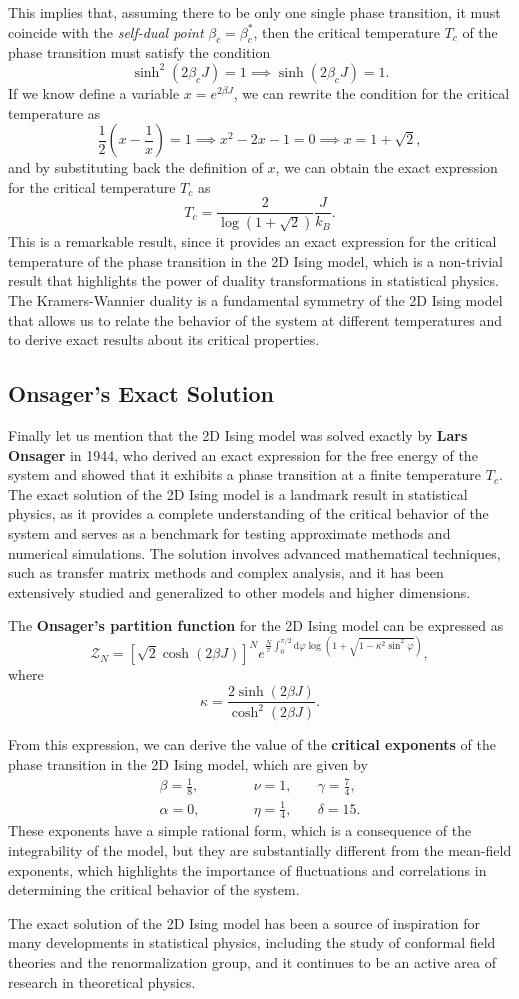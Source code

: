 This implies that, assuming there to be only one single phase transition, it must coincide with the \textit{self-dual point} \(\beta_c=\beta^*_c\), then the critical temperature \(T_c\) of the phase transition must satisfy the condition
\[
  \sinh^2(2 \beta_c J) = 1 \implies \sinh(2 \beta_c J) = 1.
\]
If we know define a variable \(x = e^{2 \beta J}\), we can rewrite the condition for the critical temperature as
\[
  \frac{1}{2}(x - \frac{1}{x}) = 1 \implies x^2 - 2 x - 1 = 0 \implies x = 1 + \sqrt{2},
\]
and by substituting back the definition of \(x\), we can obtain the exact expression for the critical temperature \(T_c\) as
\[
  T_c = \frac{2}{\log(1 + \sqrt{2})} \frac{J}{k_B}.
\]
This is a remarkable result, since it provides an exact expression for the critical temperature of the phase transition in the 2D Ising model, which is a non-trivial result that highlights the power of duality transformations in statistical physics. The Kramers-Wannier duality is a fundamental symmetry of the 2D Ising model that allows us to relate the behavior of the system at different temperatures and to derive exact results about its critical properties.

\subsection{Onsager's Exact Solution}

Finally let us mention that the 2D Ising model was solved exactly by \textbf{Lars Onsager} in 1944, who derived an exact expression for the free energy of the system and showed that it exhibits a phase transition at a finite temperature \(T_c\). The exact solution of the 2D Ising model is a landmark result in statistical physics, as it provides a complete understanding of the critical behavior of the system and serves as a benchmark for testing approximate methods and numerical simulations. The solution involves advanced mathematical techniques, such as transfer matrix methods and complex analysis, and it has been extensively studied and generalized to other models and higher dimensions.

The \textbf{Onsager's partition function} for the 2D Ising model can be expressed as
\[
  \mathcal{Z}_N = \left[\sqrt{2} \cosh(2 \beta J)\right]^N e^{\frac{N}{\pi} \int_0^{\pi / 2} \mathrm{d} \varphi \log(1 + \sqrt{1 - \kappa^2 \sin^2 \varphi})},
\]
where
\[
  \kappa = \frac{2 \sinh(2 \beta J)}{\cosh^2(2 \beta J)}.
\]

From this expression, we can derive the value of the \textbf{critical exponents} of the phase transition in the 2D Ising model, which are given by
\[
  \begin{aligned}
    \beta = \frac{1}{8},\qquad \quad & \nu = 1, \quad            & \gamma = \frac{7}{4}, \\
    \alpha = 0, \qquad \quad         & \eta = \frac{1}{4}, \quad & \delta = 15.
  \end{aligned}
\]
These exponents have a simple rational form, which is a consequence of the integrability of the model, but they are substantially different from the mean-field exponents, which highlights the importance of fluctuations and correlations in determining the critical behavior of the system.

The exact solution of the 2D Ising model has been a source of inspiration for many developments in statistical physics, including the study of conformal field theories and the renormalization group, and it continues to be an active area of research in theoretical physics.